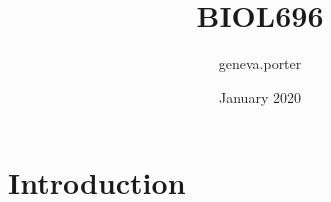 \documentclass{article}
\title{BIOL696}
\author{geneva.porter }
\date{January 2020}
\begin{document}
\maketitle

\section{Introduction}
\end{document}
